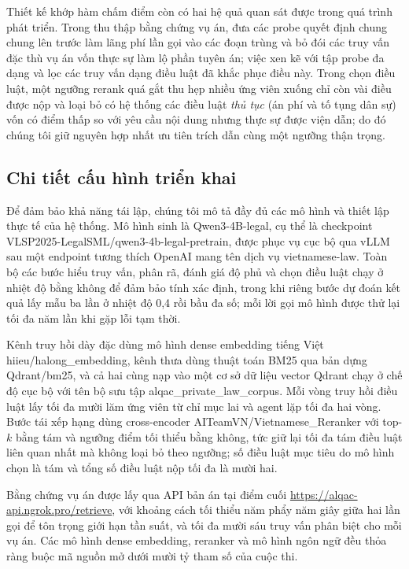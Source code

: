 \documentclass[conference]{IEEEtran}
\begin{document}
Thiết kế khớp hàm chấm điểm còn có hai hệ quả quan sát được trong quá trình phát triển. Trong thu thập bằng chứng vụ án, đưa các probe quyết định chung chung lên trước làm lãng phí lần gọi vào các đoạn trùng và bỏ đói các truy vấn đặc thù vụ án vốn thực sự làm lộ phần tuyên án; việc xen kẽ với tập probe đa dạng và lọc các truy vấn dạng điều luật đã khắc phục điều này. Trong chọn điều luật, một ngưỡng rerank quá gắt thu hẹp nhiều ứng viên xuống chỉ còn vài điều được nộp và loại bỏ có hệ thống các điều luật \emph{thủ tục} (án phí và tố tụng dân sự) vốn có điểm thấp so với yêu cầu nội dung nhưng thực sự được viện dẫn; do đó chúng tôi giữ nguyên hợp nhất ưu tiên trích dẫn cùng một ngưỡng thận trọng.

\subsection{Chi tiết cấu hình triển khai}
\label{sec:config}
Để đảm bảo khả năng tái lập, chúng tôi mô tả đầy đủ các mô hình và thiết lập
thực tế của hệ thống. Mô hình sinh là Qwen3-4B-legal, cụ thể là checkpoint
VLSP2025-LegalSML/qwen3-4b-legal-pretrain, được phục vụ cục bộ qua vLLM sau một
endpoint tương thích OpenAI mang tên dịch vụ vietnamese-law. Toàn bộ các bước
hiểu truy vấn, phân rã, đánh giá độ phủ và chọn điều luật chạy ở nhiệt độ bằng
không để đảm bảo tính xác định, trong khi riêng bước dự đoán kết quả lấy mẫu ba
lần ở nhiệt độ 0,4 rồi bầu đa số; mỗi lời gọi mô hình được thử lại tối đa năm
lần khi gặp lỗi tạm thời.

Kênh truy hồi dày đặc dùng mô hình dense embedding tiếng Việt hiieu/halong\_embedding,
kênh thưa dùng thuật toán BM25 qua bản dựng Qdrant/bm25, và cả hai cùng nạp vào
một cơ sở dữ liệu vector Qdrant chạy ở chế độ cục bộ với tên bộ sưu tập
alqac\_private\_law\_corpus. Mỗi vòng truy hồi điều luật lấy tối đa mười lăm ứng
viên từ chỉ mục lai và agent lặp tối đa hai vòng. Bước tái xếp hạng dùng
cross-encoder AITeamVN/Vietnamese\_Reranker với top-$k$ bằng tám và ngưỡng điểm
tối thiểu bằng không, tức giữ lại tối đa tám điều luật liên quan nhất mà không
loại bỏ theo ngưỡng; số điều luật mục tiêu do mô hình chọn là tám và tổng số
điều luật nộp tối đa là mười hai.

Bằng chứng vụ án được lấy qua API bản án tại điểm cuối
\url{https://alqac-api.ngrok.pro/retrieve}, với khoảng cách tối thiểu năm phẩy
năm giây giữa hai lần gọi để tôn trọng giới hạn tần suất, và tối đa mười sáu
truy vấn phân biệt cho mỗi vụ án. Các mô hình dense embedding, reranker và mô
hình ngôn ngữ đều thỏa ràng buộc mã nguồn mở dưới mười tỷ tham số của cuộc thi.
\end{document}
